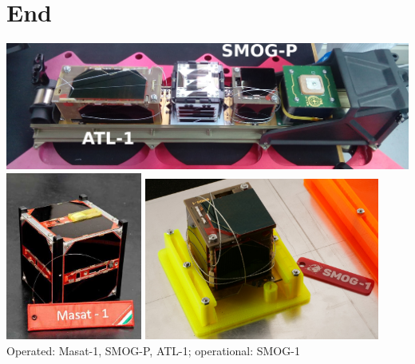 \documentclass{beamer}
\begin{document}
\section{End}
\begin{frame}
\centering
\includegraphics[width=1.0\textwidth]{albapod.jpg}\\
\includegraphics[width=0.335\textwidth]{masat1.jpg}
\hspace{5mm}
\includegraphics[width=0.58\textwidth]{smog1ready.jpg}\\
Operated: \color{blue}Masat-1, SMOG-P, ATL-1\color{black}; operational: \color{red}SMOG-1
\end{frame}
\end{document}
